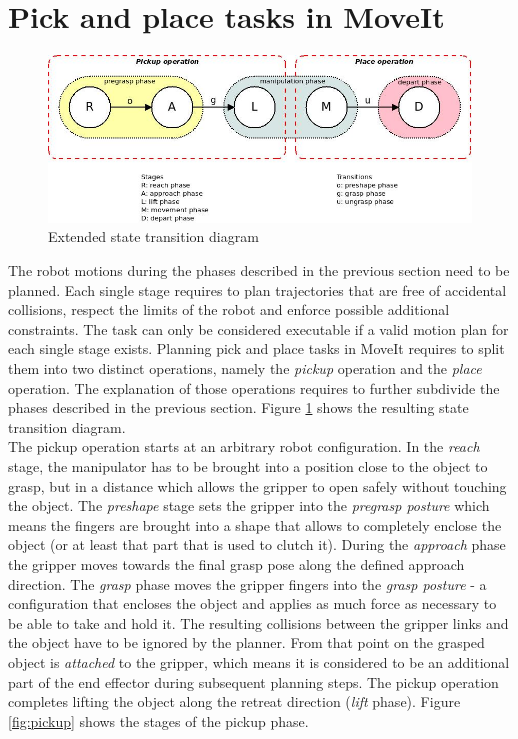 \section{Pick and place tasks in MoveIt}

\begin{figure}[ht]
	\centering
  	\includegraphics[width=1.0\textwidth]{images/pick_place_states.jpg}
	\caption{Extended state transition diagram}
	\label{fig:pick_place_states}
\end{figure}

The robot motions during the phases described in the previous section need to be planned. Each single stage requires to plan trajectories that are free of accidental collisions, respect the limits of the robot and enforce possible additional constraints. The task can only be considered executable if a valid motion plan for each single stage exists. Planning pick and place tasks in MoveIt requires to split them into two distinct operations, namely the \emph{pickup} operation and the \emph{place} operation. The explanation of those operations requires to further subdivide the phases described in the previous section. Figure \ref{fig:pick_place_states} shows the resulting state transition diagram.\\

The pickup operation starts at an arbitrary robot configuration. In the \emph{reach} stage, the manipulator has to be brought into a position close to the object to grasp, but in a distance which allows the gripper to open safely without touching the object. The \emph{preshape} stage sets the gripper into the \emph{pregrasp posture} which means the fingers are brought into a shape that allows to completely enclose the object (or at least that part that is used to clutch it). During the \emph{approach} phase the gripper moves towards the final grasp pose along the defined approach direction. The \emph{grasp} phase moves the gripper fingers into the \emph{grasp posture} - a configuration that encloses the object and applies as much force as necessary to be able to take and hold it. The resulting collisions between the gripper links and the object have to be ignored by the planner. From that point on the grasped object is \emph{attached} to the gripper, which means it is considered to be an additional part of the end effector during subsequent planning steps. The pickup operation completes lifting the object along the retreat direction (\emph{lift} phase). Figure \ref{fig:pickup} shows the stages of the pickup phase.


